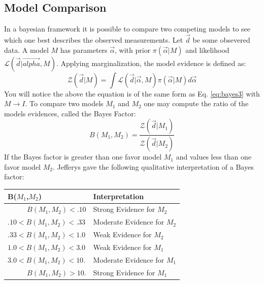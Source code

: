 \documentclass[12pt]{article}
\numberwithin{equation}{section}
\begin{document}
\subsection{Model Comparison}
In a bayesian framework it is possible to compare two competing models to see which one best describes the observed measurements.
Let $\vec{d}$ be some obsevered data. A model $M$ has parameters $\vec{\alpha}$, with prior $\pi(\vec{\alpha}|M)$ and likelihood $\mathcal{L}(\vec{d}|\vec{alpha},M)$. Applying marginalization, the model evidence is defined as:
\begin{equation} \label{eq:evidence}
	\mathcal{Z}(\vec{d}|M) = \int \mathcal{L}(\vec{d}|\vec{\alpha},M)\pi(\vec{\alpha}|M)d\vec{\alpha}
\end{equation}
You will notice the above the equation is of the same form as Eq. \ref{eq:bayes3} with $M \rightarrow I$. To compare two models $M_1$ and $M_2$ one may compute the ratio of the models evidences, called the Bayes Factor\cite{von2011bayesian}:
\begin{equation} \label{eq:bayesfactor}
	B(M_1,M_2) = \frac{\mathcal{Z}(\vec{d}|M_1)}{\mathcal{Z}(\vec{d}|M_2)} 
\end{equation}
If the Bayes factor is greater than one favor model $M_1$ and values less than one favor model $M_2$. Jefferys\cite
{jeffreys1998theory} gave the following qualitative interpretation of a Bayes factor:
\begin{center}
	\begin{tabular}{l|l}
		\bf{B($M_1$,$M_2$)} & \bf{Interpretation} \\ 
		\hline
		${\qquad \;\;\, B(M_1,M_2) < .10}$ & Strong Evidence for $M_2$ \\
		${.10 < B(M_1,M_2) < .33}$ & Moderate Evidence for $M_2$ \\
		${.33 < B(M_1,M_2) < 1.0}$ & Weak Evidence for $M_2$ \\
		${1.0 < B(M_1,M_2) < 3.0}$ & Weak Evidence for $M_1$ \\
		${3.0 < B(M_1,M_2) < 10.}$ & Moderate Evidence for $M_1$ \\
		${\qquad \;\;\, B(M_1,M_2) > 10.}$ & Strong Evidence for $M_1$ \\
	\end{tabular}
	\label{tab:bayesfactor}
\end{center}
\end{document}
